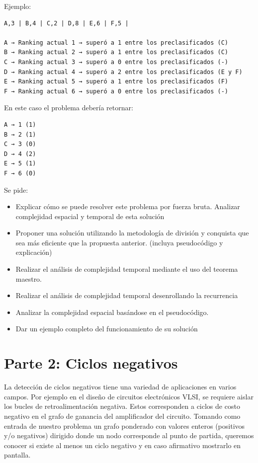 \documentclass[titlepage,a4paper]{article}
\begin{document}
Ejemplo:

\begin{verbatim}
A,3 | B,4 | C,2 | D,8 | E,6 | F,5 |

A → Ranking actual 1 → superó a 1 entre los preclasificados (C)
B → Ranking actual 2 → superó a 1 entre los preclasificados (C)
C → Ranking actual 3 → superó a 0 entre los preclasificados (-)
D → Ranking actual 4 → superó a 2 entre los preclasificados (E y F)
E → Ranking actual 5 → superó a 1 entre los preclasificados (F)
F → Ranking actual 6 → superó a 0 entre los preclasificados (-)
\end{verbatim}

En este caso el problema debería retornar:

\begin{verbatim}
A → 1 (1)
B → 2 (1)
C → 3 (0)
D → 4 (2)
E → 5 (1)
F → 6 (0)
\end{verbatim}

Se pide:

\begin{itemize}
\item Explicar cómo se puede resolver este problema por fuerza bruta. Analizar complejidad espacial y temporal de esta solución

\item Proponer una solución utilizando la metodología de división y conquista que sea más eficiente que la propuesta anterior. (incluya pseudocódigo y explicación)

\item Realizar el análisis de complejidad temporal mediante el uso del teorema maestro.

\item Realizar el análisis de complejidad temporal desenrollando la recurrencia

\item Analizar la complejidad espacial basándose en el pseudocódigo.

\item Dar un ejemplo completo del funcionamiento de su solución
\end{itemize}

\section{Parte 2: Ciclos negativos}
\label{sec:org14635cf}

La detección de ciclos negativos tiene una variedad de aplicaciones en varios campos. Por ejemplo en el diseño de circuitos electrónicos VLSI, se requiere aislar los bucles de retroalimentación negativa. Estos corresponden a ciclos de costo negativo en el grafo de ganancia del amplificador del circuito. Tomando como entrada de nuestro problema un grafo ponderado con valores enteros (positivos y/o negativos) dirigido donde un nodo corresponde al punto de partida, queremos conocer si existe al menos un ciclo negativo y en caso afirmativo mostrarlo en pantalla.
\end{document}
